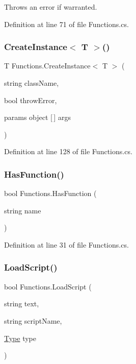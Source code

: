 Throws an error if warranted. 



Definition at line 71 of file Functions.\+cs.

\mbox{\label{class_functions_a9e6e97f260832a313e636662a08b0311}} 
\subsubsection{\texorpdfstring{Create\+Instance$<$ T $>$()}{CreateInstance< T >()}}
{\footnotesize\ttfamily T Functions.\+Create\+Instance$<$ T $>$ (\begin{DoxyParamCaption}\item[{string}]{class\+Name,  }\item[{bool}]{throw\+Error,  }\item[{params object \mbox{[}$\,$\mbox{]}}]{args }\end{DoxyParamCaption})}



Definition at line 128 of file Functions.\+cs.

\mbox{\label{class_functions_a76e2be7aabf4daac93ec85056f9439c9}} 
\subsubsection{\texorpdfstring{Has\+Function()}{HasFunction()}}
{\footnotesize\ttfamily bool Functions.\+Has\+Function (\begin{DoxyParamCaption}\item[{string}]{name }\end{DoxyParamCaption})}



Definition at line 31 of file Functions.\+cs.

\mbox{\label{class_functions_a44ec162e65030c8e050b7217825c06e4}} 
\subsubsection{\texorpdfstring{Load\+Script()}{LoadScript()}}
{\footnotesize\ttfamily bool Functions.\+Load\+Script (\begin{DoxyParamCaption}\item[{string}]{text,  }\item[{string}]{script\+Name,  }\item[{\hyperlink{class_functions_a652bc8a0dcb6afd360459f15e2d9bdf4}{Type}}]{type }\end{DoxyParamCaption})}



